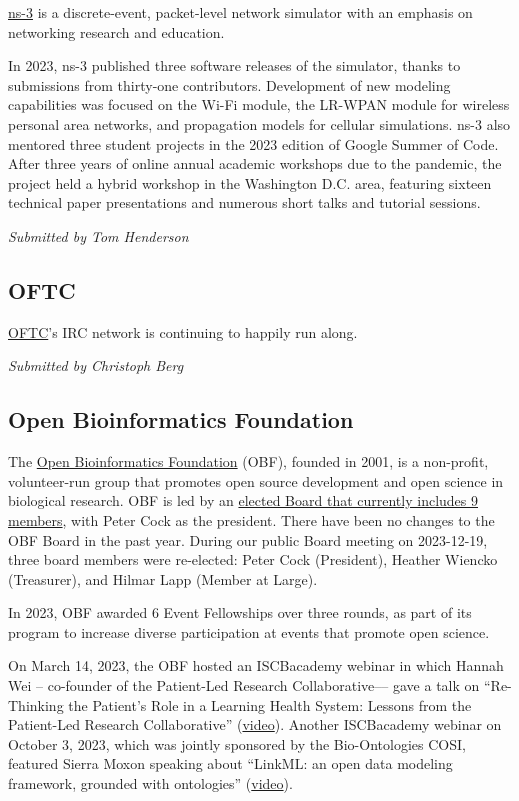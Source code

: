\documentclass[a4paper]{report}
\begin{document}
\href{https://www.nsnam.org}{ns-3} is a discrete-event, packet-level network simulator with an emphasis on networking research and education.

In 2023, ns-3 published three software releases of the simulator, thanks to submissions from thirty-one contributors.  Development of new modeling capabilities was focused on the Wi-Fi module, the LR-WPAN module for wireless personal area networks, and propagation models for cellular simulations.  ns-3 also mentored three student projects in the 2023 edition of Google Summer of Code.  After three years of online annual academic workshops due to the pandemic, the project held a hybrid workshop in the Washington D.C. area, featuring sixteen technical paper presentations and numerous short talks and tutorial sessions.

{\em Submitted by Tom Henderson}

\subsection{OFTC}

\href{https://oftc.net/}{OFTC}'s IRC network is continuing to happily run along.

{\em Submitted by Christoph Berg}

\subsection{Open Bioinformatics Foundation}

The \href{https://www.open-bio.org/}{Open Bioinformatics Foundation} (OBF), founded in 2001, is a non-profit, volunteer-run group that promotes open source development and open science in biological research. OBF is led by an \href{https://open-bio.org/board/ }{elected Board that currently includes 9 members}, with Peter Cock as the president. There have been no changes to the OBF Board in the past year.  During our public Board meeting on 2023-12-19, three board members were re-elected: Peter Cock (President), Heather Wiencko (Treasurer), and Hilmar Lapp (Member at Large).

In 2023, OBF awarded 6 Event Fellowships over three rounds, as part of its program to increase diverse participation at events that promote open science.

On March 14, 2023, the OBF hosted an ISCBacademy webinar in which Hannah Wei -- co-founder of the Patient-Led Research Collaborative–-- gave a talk on ``Re-Thinking the Patient's Role in a Learning Health System: Lessons from the Patient-Led Research Collaborative'' (\href{https://youtu.be/M2vAotWKd_Q}{video}). Another ISCBacademy webinar on October 3, 2023, which was jointly sponsored by the Bio-Ontologies COSI, featured Sierra Moxon speaking about ``LinkML: an open data modeling framework, grounded with ontologies'' (\href{https://youtu.be/CwyncsMMdNA}{video}).
\end{document}
